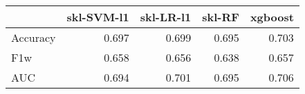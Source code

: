 \begin{tabular}{lrrrr}
\toprule
{} &  skl-SVM-l1 &  skl-LR-l1 &  skl-RF &  xgboost \\
\midrule
Accuracy &       0.697 &      0.699 &   0.695 &    0.703 \\
F1w      &       0.658 &      0.656 &   0.638 &    0.657 \\
AUC      &       0.694 &      0.701 &   0.695 &    0.706 \\
\bottomrule
\end{tabular}
